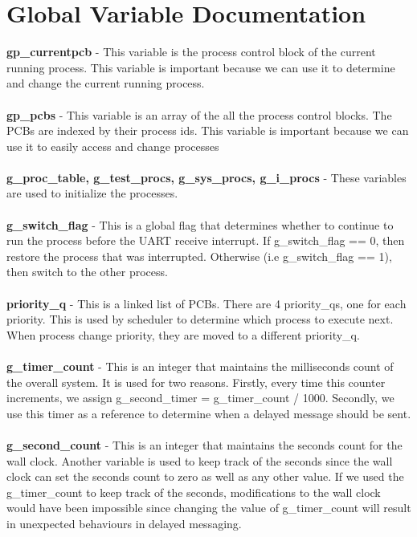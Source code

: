 \documentclass[12pt]{article}
\begin{document}
\section{Global Variable Documentation}
\textbf{gp\_currentpcb} - This variable is the process control block of the current running process. This variable is important because we can use it to determine and change the current running process.\\ \\
\textbf{gp\_pcbs} - This variable is an array of the all the process control blocks. The PCBs are indexed by their process ids. This variable is important because we can use it to easily access and change processes\\ \\
\textbf{g\_proc\_table,  g\_test\_procs, g\_sys\_procs, g\_i\_procs} - These variables are used to initialize the processes.\\ \\
\textbf{g\_switch\_flag} - This is a global flag that determines whether to continue to run the process before the UART receive interrupt. If g\_switch\_flag == 0, then restore the process that was interrupted. Otherwise (i.e g\_switch\_flag == 1), then switch to the other process.\\ \\
\textbf{priority\_q}  - This is a linked list of PCBs. There are 4 priority\_qs, one for each priority. This is used by scheduler to determine which process to execute next. When process change priority, they are moved to a different priority\_q.\\ \\
\textbf{g\_timer\_count} - This is an integer that maintains the milliseconds count of the overall system. It is used for two reasons. Firstly, every time this counter increments, we assign g\_second\_timer = g\_timer\_count / 1000. Secondly, we use this timer as a reference to determine when a delayed message should be sent. \\ \\
\textbf{g\_second\_count} - This is an integer that maintains the seconds count for the wall clock. Another variable is used to keep track of the seconds since the wall clock can set the seconds count to zero as well as any other value. If we used the g\_timer\_count to keep track of the seconds, modifications to the wall clock would have been impossible since changing the value of g\_timer\_count will result in unexpected behaviours in delayed messaging.\\ \\
\end{document}
